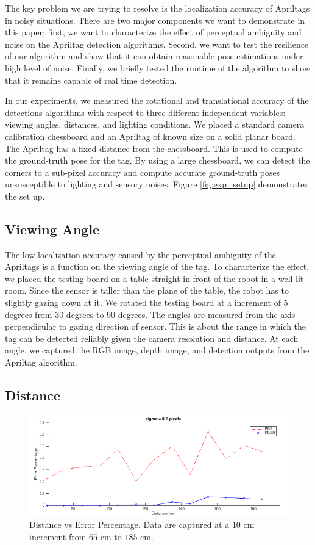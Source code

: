 \label{sec:res}
The key problem we are trying to resolve is the localization accuracy of Apriltags in noisy situations. There are two major components we want to demonstrate in this paper: first, we want to characterize the effect of perceptual ambiguity and noise on the Apriltag detection algorithms. Second, we want to test the resilience of our algorithm and show that it can obtain reasonable pose estimations under high level of noise. Finally, we briefly tested the runtime of the algorithm to show that it remains capable of real time detection. 

In our experiments, we measured the rotational and translational accuracy of the detections algorithms with respect to three different independent variables: viewing angles, distances, and lighting conditions. We placed a standard camera calibration chessboard and an Apriltag of known size on a solid planar board. The Apriltag has a fixed distance from the chessboard. This is used to compute the ground-truth pose for the tag. By using a large chessboard, we can detect the corners to a sub-pixel accuracy and compute accurate ground-truth poses unsusceptible to lighting and sensory noises. Figure \ref{fig:exp_setup} demonstrates the set up. 

\subsection{Viewing Angle}

The low localization accuracy caused by the perceptual ambiguity of the Apriltags is a function on the viewing angle of the tag. To characterize the effect, we placed the testing board on a table straight in front of the robot in a well lit room. Since the sensor is taller than the plane of the table, the robot has to slightly gazing down at it.  We rotated the testing board at a increment of 5 degrees from 30 degrees to 90 degrees. The angles are measured from the axis perpendicular to gazing direction of sensor. This is about the range in which the tag can be detected reliably given the camera resolution and distance. At each angle, we captured the RGB image, depth image, and detection outputs from the Apriltag algorithm. 

\subsection{Distance}
\begin{figure}
\centering
\includegraphics[width=\columnwidth]{figs/distance_fig1}
\caption{Distance vs Error Percentage. Data are captured at a $10$ cm increment from $65$ cm to $185$ cm.}
\label{fig:distance_result}
\end{figure}

